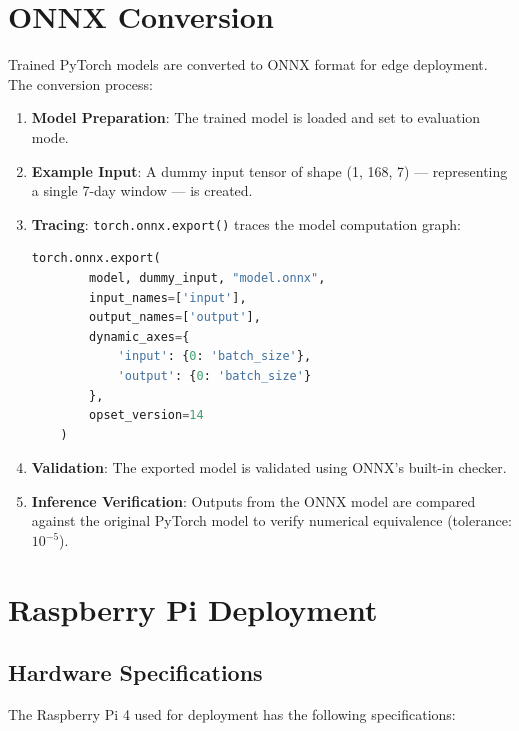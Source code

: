 \section{ONNX Conversion}

Trained PyTorch models are converted to ONNX format for edge deployment. The conversion process:

\begin{enumerate}
    \item \textbf{Model Preparation}: The trained model is loaded and set to evaluation mode.
    \item \textbf{Example Input}: A dummy input tensor of shape (1, 168, 7) --- representing a single 7-day window --- is created.
    \item \textbf{Tracing}: \texttt{torch.onnx.export()} traces the model computation graph:
    
    \begin{lstlisting}[language=Python]
    torch.onnx.export(
        model, dummy_input, "model.onnx",
        input_names=['input'],
        output_names=['output'],
        dynamic_axes={
            'input': {0: 'batch_size'},
            'output': {0: 'batch_size'}
        },
        opset_version=14
    )
    \end{lstlisting}
    
    \item \textbf{Validation}: The exported model is validated using ONNX's built-in checker.
    \item \textbf{Inference Verification}: Outputs from the ONNX model are compared against the original PyTorch model to verify numerical equivalence (tolerance: $10^{-5}$).
\end{enumerate}

\section{Raspberry Pi Deployment}

\subsection{Hardware Specifications}

The Raspberry Pi 4 used for deployment has the following specifications:

